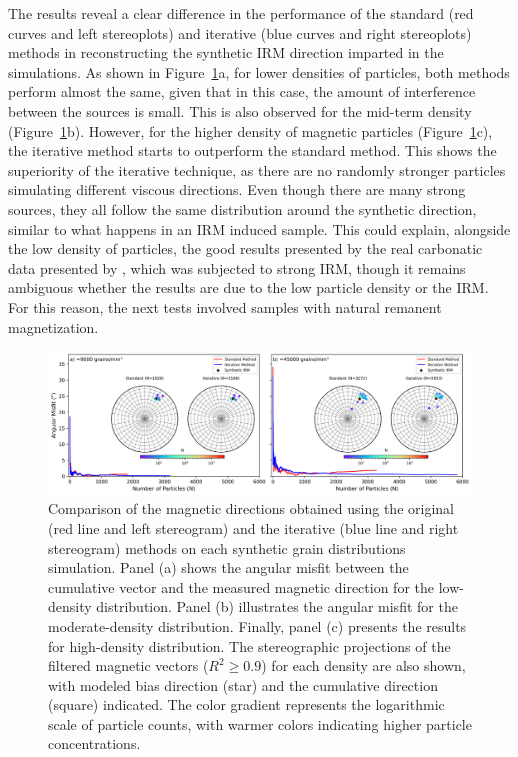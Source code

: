 The results reveal a clear difference in the performance of the standard (red curves and left stereoplots) and iterative (blue curves and right stereoplots) methods in reconstructing the synthetic IRM direction imparted in the simulations. As shown in Figure~\ref{synthetic-data-stereograms}a, for lower densities of particles, both methods perform almost the same, given that in this case, the amount of interference between the sources is small. This is also observed for the mid-term density (Figure~\ref{synthetic-data-stereograms}b). However, for the higher density of magnetic particles (Figure~\ref{synthetic-data-stereograms}c), the iterative method starts to outperform the standard method. This shows the superiority of the iterative technique, as there are no randomly stronger particles simulating different viscous directions. Even though there are many strong sources, they all follow the same distribution around the synthetic direction, similar to what happens in an IRM induced sample. This could explain, alongside the low density of particles, the good results presented by the real carbonatic data presented by \citet{Souza-Junior2024}, which was subjected to strong IRM, though it remains ambiguous whether the results are due to the low particle density or the IRM. For this reason, the next tests involved samples with natural remanent magnetization.

\begin{figure}[tb!]
  \centering
  \includegraphics[width=1.0\linewidth]{paper/figures/synthetic-different-densities-stereoplot.png}
  \caption{
Comparison of the magnetic directions obtained using the original (red line and left stereogram) and the iterative (blue line and right stereogram) methods on each synthetic grain distributions simulation. Panel (a) shows the angular misfit between the cumulative vector and the measured magnetic direction for the low-density distribution. Panel (b) illustrates the angular misfit for the moderate-density distribution. Finally, panel (c) presents the results for high-density distribution. The stereographic projections of the filtered magnetic vectors ($R^2 \geq 0.9$) for each density are also shown, with modeled bias direction (star) and the cumulative direction (square) indicated. The color gradient represents the logarithmic scale of particle counts, with warmer colors indicating higher particle concentrations.
  }
  \label{synthetic-data-stereograms}
\end{figure}


